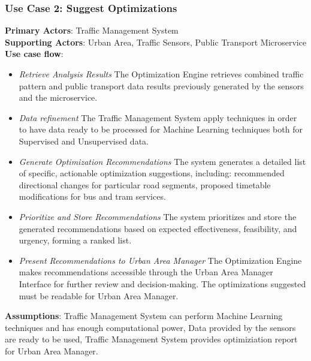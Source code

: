 \documentclass[a4paper,12pt]{article}
\begin{document}
\subsubsection*{Use Case 2: Suggest Optimizations}
\textbf{Primary Actors}: Traffic Management System \\
\textbf{Supporting Actors}:  Urban Area, Traffic Sensors, Public Transport Microservice \\
\textbf{Use case flow}: 
\begin{itemize}
\item \textit{Retrieve Analysis Results}
The Optimization Engine retrieves combined traffic pattern and public transport data results previously generated by the sensors and the microservice.
\item \textit{Data refinement} The Traffic Management System apply techniques in order to have data ready to be processed for Machine Learning techniques both for Supervised and Unsupervised data.
\item \textit{Generate Optimization Recommendations} The system generates a detailed list of specific, actionable optimization suggestions, including: recommended directional changes for particular road segments, proposed timetable modifications for bus and tram services.
\item \textit{Prioritize and Store Recommendations} The system prioritizes and store the generated recommendations based on expected effectiveness, feasibility, and urgency, forming a ranked list.
\item \textit{Present Recommendations to Urban Area Manager} The Optimization Engine makes recommendations accessible through the Urban Area Manager Interface for further review and decision-making. The optimizations suggested must be readable for Urban Area Manager.
\end{itemize}
\textbf{Assumptions}: Traffic Management System can perform Machine Learning techniques and has enough computational power, Data provided by the sensors are ready to be used, Traffic Management System provides optimiziation report for Urban Area Manager. \\
\end{document}
